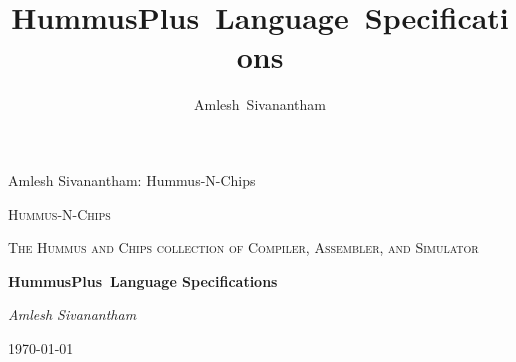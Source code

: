 \documentclass[12pt,journal,compsoc]{article}
\begin{document}
\title{HummusPlus~Language~Specifications}
\author{Amlesh~Sivanantham}
\date{}

{Amlesh Sivanantham: Hummus-N-Chips}




\begin{titlepage}
  \begin{center}
    \vfill
    {\scshape\LARGE Hummus-N-Chips \par}
    \vspace{1cm}
    {\scshape\Large The Hummus and Chips collection of Compiler, Assembler, 
                    and Simulator\par}
    \vspace{1.5cm}
    {\huge\bfseries HummusPlus~Language Specifications\par}
    \vspace{2cm}
    {\Large\itshape Amlesh Sivanantham\par}
    \vspace{1cm}
    {\large \today\par}
  \end{center}
\end{titlepage}

\clearpage

\maketitle
\end{document}
